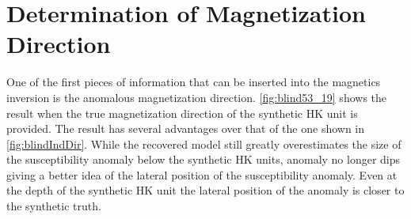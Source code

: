 \FloatBarrier

\section{Determination of Magnetization Direction}
\label{sec:Determination of Magnetization Dirrection}

One of the first pieces of information that can be inserted into the magnetics inversion is the anomalous magnetization direction. \autoref{fig:blind53_19} shows the result when the true magnetization direction of the synthetic HK unit is provided. The result has several advantages over that of the one shown in \autoref{fig:blindIndDir}. While the recovered model still greatly overestimates the size of the susceptibility anomaly below the synthetic HK units, anomaly no longer dips giving a better idea of the lateral position of the susceptibility anomaly. Even at the depth of the synthetic HK unit the lateral position of the anomaly is closer to the synthetic truth.

